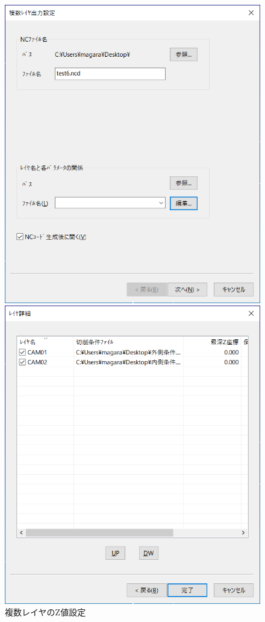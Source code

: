 \begin{figure}[H]
\begin{minipage}[t]{0.5\textwidth}
\centering
\includegraphics[scale=0.6]{No3/fig/25d-make3.png}
\end{minipage}
\begin{minipage}[t]{0.5\textwidth}
\centering
\includegraphics[scale=0.6]{No3/fig/25d-make4.png}
\end{minipage}
\caption{複数レイヤのZ値設定}
\label{fig:25d-make3.png}
\end{figure}

